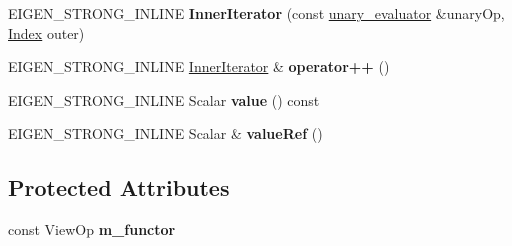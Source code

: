 \begin{DoxyCompactItemize}
E\+I\+G\+E\+N\+\_\+\+S\+T\+R\+O\+N\+G\+\_\+\+I\+N\+L\+I\+NE {\bfseries Inner\+Iterator} (const \hyperlink{struct_eigen_1_1internal_1_1unary__evaluator}{unary\+\_\+evaluator} \&unary\+Op, \hyperlink{namespace_eigen_a62e77e0933482dafde8fe197d9a2cfde}{Index} outer)
\item 
\mbox{\label{class_eigen_1_1internal_1_1unary__evaluator_3_01_cwise_unary_view_3_01_view_op_00_01_arg_type_011a5afe598192a9657664b0cfbd26765b_adeb8c48838ea2516072bdd57fba090c1}} 
E\+I\+G\+E\+N\+\_\+\+S\+T\+R\+O\+N\+G\+\_\+\+I\+N\+L\+I\+NE \hyperlink{class_eigen_1_1_inner_iterator}{Inner\+Iterator} \& {\bfseries operator++} ()
\item 
\mbox{\label{class_eigen_1_1internal_1_1unary__evaluator_3_01_cwise_unary_view_3_01_view_op_00_01_arg_type_011a5afe598192a9657664b0cfbd26765b_a7278f1a034525f7bc6950d626a15e9d5}} 
E\+I\+G\+E\+N\+\_\+\+S\+T\+R\+O\+N\+G\+\_\+\+I\+N\+L\+I\+NE Scalar {\bfseries value} () const
\item 
\mbox{\label{class_eigen_1_1internal_1_1unary__evaluator_3_01_cwise_unary_view_3_01_view_op_00_01_arg_type_011a5afe598192a9657664b0cfbd26765b_acf8b0de322270d6fad83ce54e8460ee0}} 
E\+I\+G\+E\+N\+\_\+\+S\+T\+R\+O\+N\+G\+\_\+\+I\+N\+L\+I\+NE Scalar \& {\bfseries value\+Ref} ()
\end{DoxyCompactItemize}
\subsection*{Protected Attributes}
\begin{DoxyCompactItemize}
\item 
\mbox{\label{class_eigen_1_1internal_1_1unary__evaluator_3_01_cwise_unary_view_3_01_view_op_00_01_arg_type_011a5afe598192a9657664b0cfbd26765b_a899c81f1f6265765146a7aaae76823fa}} 
const View\+Op {\bfseries m\+\_\+functor}
\end{DoxyCompactItemize}


